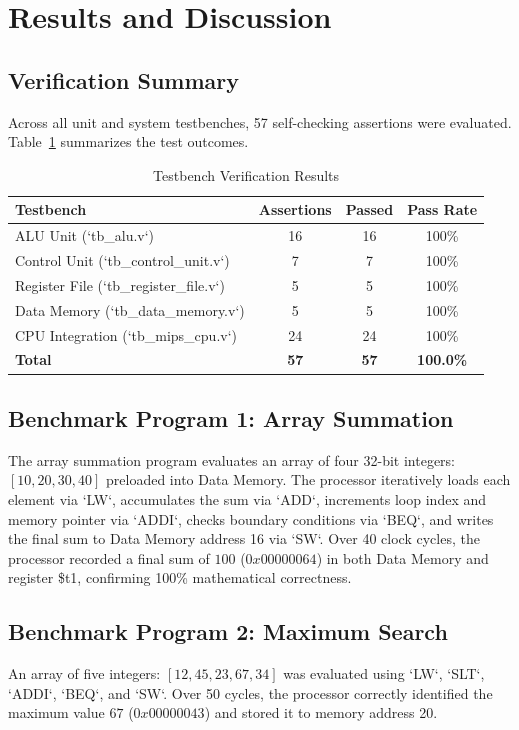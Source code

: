 \documentclass[conference]{IEEEtran}
\begin{document}
\section{Results and Discussion}

\subsection{Verification Summary}
Across all unit and system testbenches, 57 self-checking assertions were evaluated. Table~\ref{tab_results} summarizes the test outcomes.

\begin{table}[htbp]
\caption{Testbench Verification Results}
\label{tab_results}
\centering
\begin{tabular}{lccc}
\toprule
\textbf{Testbench} & \textbf{Assertions} & \textbf{Passed} & \textbf{Pass Rate} \\
\midrule
ALU Unit (`tb_alu.v`) & 16 & 16 & 100\% \\
Control Unit (`tb_control_unit.v`) & 7 & 7 & 100\% \\
Register File (`tb_register_file.v`) & 5 & 5 & 100\% \\
Data Memory (`tb_data_memory.v`) & 5 & 5 & 100\% \\
CPU Integration (`tb_mips_cpu.v`) & 24 & 24 & 100\% \\
\midrule
\textbf{Total} & \textbf{57} & \textbf{57} & \textbf{100.0\%} \\
\bottomrule
\end{tabular}
\end{table}

\subsection{Benchmark Program 1: Array Summation}
The array summation program evaluates an array of four 32-bit integers: $[10, 20, 30, 40]$ preloaded into Data Memory. The processor iteratively loads each element via `LW`, accumulates the sum via `ADD`, increments loop index and memory pointer via `ADDI`, checks boundary conditions via `BEQ`, and writes the final sum to Data Memory address 16 via `SW`. Over 40 clock cycles, the processor recorded a final sum of $100$ ($0x00000064$) in both Data Memory and register \$t1, confirming 100\% mathematical correctness.

\subsection{Benchmark Program 2: Maximum Search}
An array of five integers: $[12, 45, 23, 67, 34]$ was evaluated using `LW`, `SLT`, `ADDI`, `BEQ`, and `SW`. Over 50 cycles, the processor correctly identified the maximum value $67$ ($0x00000043$) and stored it to memory address 20.
\end{document}
